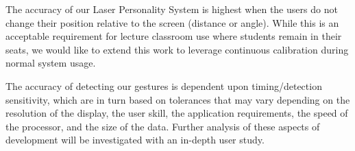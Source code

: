 \documentclass[runningheads,a4paper]{llncs}
\begin{document}


The accuracy of our Laser Personality System is highest when
the  users do not change
their position relative to the screen (distance or angle).
While this is an acceptable requirement for lecture classroom use where students remain in their seats,
%
we would like to extend this work to 
leverage continuous calibration during normal system usage.

The accuracy of detecting our gestures is dependent upon
timing/detection sensitivity, which are in turn based on tolerances
that may vary depending on the resolution of the display, the user
skill, the application requirements, the speed of the processor, and
the size of the data.  Further analysis of these aspects of
development will be investigated with an in-depth user study.


\end{document}
